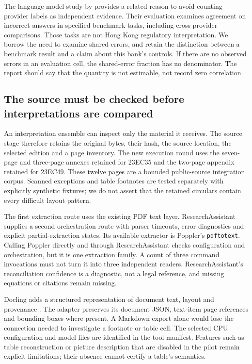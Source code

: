 \documentclass[12pt,a4paper,oneside,openany]{book}
\begin{document}
The language-model study by \citet{kim2025correlated} provides a related reason
to avoid counting provider labels as independent evidence. Their evaluation
examines agreement on incorrect answers in specified benchmark tasks, including
cross-provider comparisons. Those tasks are not Hong Kong regulatory
interpretation. We borrow the need to examine shared errors, and retain the
distinction between a benchmark result and a claim about this bank's controls.
If there are no observed errors in an evaluation cell, the shared-error fraction
has no denominator. The report should say that the quantity is not estimable,
not record zero correlation.

\subsection{The source must be checked before interpretations are compared}

An interpretation ensemble can inspect only the material it receives. The source
stage therefore retains the original bytes, their hash, the source location,
the selected edition and a page inventory. The new execution round uses the
seven-page and three-page annexes retained for 23EC35 and the two-page appendix
retained for 23EC49. These twelve pages are a bounded public-source integration
corpus. Scanned exceptions and table footnotes are tested separately with
explicitly synthetic fixtures; we do not assert that the retained circulars
contain every difficult layout pattern.

The first extraction route uses the existing PDF text layer. ResearchAssistant
supplies a second orchestration route with parser timeouts, error diagnostics and
explicit partial-extraction states. Its available extractor is Poppler's
\texttt{pdftotext}. Calling Poppler directly and through ResearchAssistant checks
configuration and orchestration, but it is one extraction family. A count of
three command invocations must not turn it into three independent readers.
ResearchAssistant's reconciliation confidence is a diagnostic, not a legal
reference, and missing equations or citations remain missing.

Docling adds a structured representation of document text, layout and provenance
\citep{doclingsoftware}. The adapter preserves its document JSON, text-item page
references and bounding boxes where present. A Markdown export alone would lose
the connection needed to investigate a footnote or table cell. The selected
CPU configuration and model files are identified in the tool manifest. Features
such as table reconstruction or picture description that are disabled in the
pilot remain explicit limitations; their absence cannot certify a table's
semantics.
\end{document}
